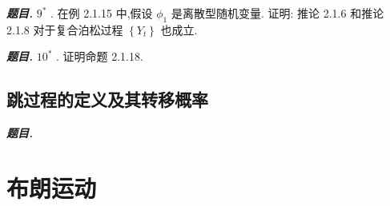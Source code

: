 \documentclass[10pt, a4paper, oneside]{ctexart}
\newenvironment{problem}{\begin{framed}\par\noindent\textbf{\textit{题目. }}}{\end{framed}\par}
\begin{document}
\begin{problem}
    \( {9}^{ * } \) . 在例 2.1.15 中,假设 \( {\phi }_{1} \) 是离散型随机变量. 证明: 推论 2.1.6 和推论 2.1.8 对于复合泊松过程 \( \left\{  {Y}_{t}\right\}   \) 也成立.
\end{problem}

\begin{problem}
    \( {10}^{ * } \) . 证明命题 2.1.18.
\end{problem}

\subsection{跳过程的定义及其转移概率}
\begin{problem}
    
\end{problem}

\section{布朗运动}
\end{document}
